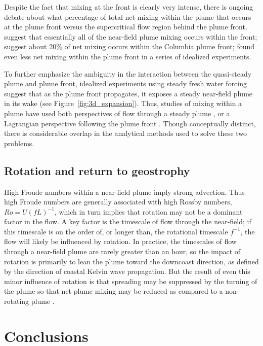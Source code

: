 \documentclass[12pt]{article}
\begin{document}
{Despite the fact that mixing at the front is clearly very intense, there is ongoing debate about what percentage of total net mixing within the plume that occurs at the plume front versus the supercritical flow region behind the plume front. \citet{pritchard.huntley:06} suggest that essentially all of the near-field plume mixing occurs within the front; \citet{orton.jay:05} suggest about 20\% of net mixing occurs within the Columbia plume front; \citet{cole:14} found even less net mixing within the plume front in a series of idealized experiments.

To further emphasize the ambiguity in the interaction between the quasi-steady plume and plume front, idealized experiments using steady fresh water forcing suggest that as the plume front propagates, it exposes a steady near-field plume in its wake (see Figure~\ref{fig:3d_expansion}). Thus, studies of mixing within a plume have used both perspectives of flow through a steady plume \citep{hetland:10a}, or a Lagrangian perspective following the plume front \citep{jay.ea:00}. Though conceptually distinct, there is considerable overlap in the analytical methods used to solve these two problems.


\subsection{Rotation and return to geostrophy}

High Froude numbers within a near-field plume imply strong advection. Thus high Froude numbers are generally associated with high Rossby numbers, $Ro = U (f L)^{-1}$, which in turn implies that rotation may not be a dominant factor in the flow. A key factor is the timescale of flow through the near-field; if this timescale is on the order of, or longer than, the rotational timescale $f^{-1}$, the flow will likely be influenced by rotation. In practice, the timescales of flow through a near-field plume are rarely greater than an hour, so the impact of rotation is primarily to lean the plume toward the downcoast direction, as defined by the direction of coastal Kelvin wave propagation. But the result of even this minor influence of rotation is that spreading may be suppressed by the turning of the plume so that net plume mixing may be reduced as compared to a non-rotating plume \citep{cole.hetland:16}.

\section{Conclusions}

}
\end{document}
